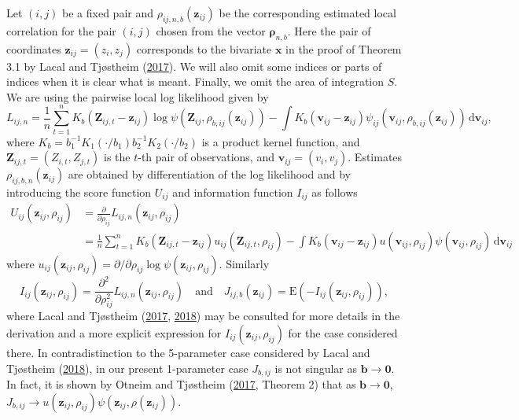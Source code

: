 \documentclass[
  12pt,
  letterpaper]{article}
\numberwithin{equation}{section}
\newcommand{\x}{\bm{x}}
\newcommand{\Z}{\bm{Z}}
\newcommand{\z}{\bm{z}}
\newcommand{\fv}{\bm{v}}
\newcommand{\frho}{\bm{\rho}}
\newcommand{\bb}{\bm{b}}
\newcommand{\E}{\textrm{E}}
\newcommand{\di}{\,\textrm{d}}
\begin{document}
Let \((i,j)\) be a fixed pair and \(\rho_{ij,n,b}(\z_{ij})\) be the corresponding estimated local correlation for the pair \((i,j)\) chosen from the vector \(\frho_{n,b}\). Here the pair of coordinates \(\z_{ij} = (z_i,z_j)\) corresponds to the bivariate \(\x\) in the proof of Theorem 3.1 by Lacal and Tjøstheim (\protect\hyperlink{ref-lacal2017local}{2017}). We will also omit some indices or parts of indices when it is clear what is meant. Finally, we omit the area of integration \(S\). We are using the pairwise local log likelihood given by
\[
L_{ij,n} = \frac{1}{n} \sum_{t=1}^{n} K_b(\Z_{ij,t}-\z_{ij}) \log \psi\left(\Z_{ij},\rho_{b,ij}(\z_{ij})\right) - \int K_b(\fv_{ij}-\z_{ij}) \psi_{ij}(\fv_{ij},\rho_{b,ij}(\z_{ij})) \di \fv_{ij},
\]
where \(K_b = b_1^{-1}K_1(\cdot/b_1) b_2^{-1} K_2(\cdot/b_2)\) is a product kernel function, and \(\Z_{ij,t} = (Z_{i,t},Z_{j,t})\) is the \(t\)-th pair of observations, and \(\fv_{ij} = (v_i,v_j)\). Estimates \(\rho_{ij,b,n}(\z_{ij})\) are obtained by differentiation of the log likelihood and by introducing the score function \(U_{ij}\) and information function \(I_{ij}\) as follows
\begin{align*}
U_{ij}(\z_{ij},\rho_{ij}) & = \frac{\partial}{\partial \rho_{ij}}L_{ij,n}(\z_{ij},\rho_{ij}) \\
& = \frac{1}{n}\sum_{t=1}^{n}K_b(\Z_{ij,t}-\z_{ij})u_{ij}(\Z_{ij,t},\rho_{ij}) - 
\int K_b(\fv_{ij}-\z_{ij})u(\fv_{ij},\rho_{ij})\psi(\fv_{ij},\rho_{ij}) \di \fv_{ij}
\end{align*}
where \(u_{ij}(\z_{ij},\rho_{ij}) = \partial/\partial \rho_{ij} \log \psi(\z_{ij},\rho_{ij})\). Similarly
\[
I_{ij}(\z_{ij},\rho_{ij}) = \frac{\partial^2}{\partial \rho_{ij}^2} L_{ij,n}(\z_{ij}, \rho_{ij}) \quad \mbox{and} \quad J_{ij,b}(\z_{ij}) = \E(-I_{ij}(\z_{ij},\rho_{ij})),
\]
where Lacal and Tjøstheim (\protect\hyperlink{ref-lacal2017local}{2017}, \protect\hyperlink{ref-lacal2018estimating}{2018}) may be consulted for more details in the derivation and a more explicit expression for \(I_{ij}(\z_{ij},\rho_{ij})\) for the case considered there. In contradistinction to the 5-parameter case considered by Lacal and Tjøstheim (\protect\hyperlink{ref-lacal2018estimating}{2018}), in our present 1-parameter case \(J_{b,ij}\) is not singular as \(\bb \to \bm{0}\). In fact, it is shown by Otneim and Tjøstheim (\protect\hyperlink{ref-otneim2017locally}{2017}, Theorem 2) that as \(\bb \to \bm{0}\), \(J_{b,ij} \to u(\z_{ij},\rho_{ij})\psi(\z_{ij},\rho(\z_{ij}))\).
\end{document}
